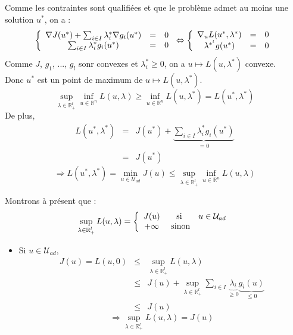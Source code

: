 \begin{dem}
Comme les contraintes sont qualifiées et que le problème admet au moins une solution $u^*$, on a :
\[\left\{ \begin{array}{c c c} 
	\nabla J(u^*) + \sum_{i\in I} \lambda_i^* \nabla g_i(u^*) &=& 0 \\
	\sum_{i\in I} \lambda_i^* g_i(u^*) &=& 0
\end{array}\right. \Leftrightarrow 
\left\{ \begin{array}{c c c}
	\nabla_u L(u^*,\lambda^*)&=&0 \\
	\lambda^{*^t} g(u^*)&=&0
\end{array} \right. \]
Comme $J$, $g_1$, ..., $g_l$ sonr convexes et $\lambda_i^*\geq 0$, on a $u\mapsto L(u,\lambda^*)$ convexe.\\
Donc $u^*$ est un point de maximum de $u\mapsto L(u,\lambda^*)$.
\[\sup_{\lambda\in \mathbb{R}^l_+} \inf_{u\in \mathbb{R}^n} L(u,\lambda) \geq \inf_{u\in \mathbb{R}^n} L(u,\lambda^*)=L(u^*,\lambda^*)\]
De plus,
\begin{eqnarray*}
	L(u^*,\lambda^*)&=&J(u^*)+\underbrace{\sum_{i\in I} \lambda_i^* g_i(u^*)}_{=0} \\
			&=&J(u^*)
\end{eqnarray*}
\[\Rightarrow L(u^*,\lambda^*)=\min_{u\in\mathcal{U}_{ad}} J(u)\leq \sup_{\lambda\in\mathbb{R}^l_+} \inf_{u\in\mathbb{R}^n} L(u,\lambda)\]

\bigskip
Montrons à présent que :
\[\sup_{\lambda\in\mathbb{R}^l_+} L(u,\lambda)=\left\{ \begin{array}{c c c}
	J(u) &\text{ si }& u\in\mathcal{U}_{ad}\\
	+\infty &\text{ sinon}&
\end{array} \right.\]

\begin{itemize}
	\item Si $u\in \mathcal{U}_{ad}$,
	\begin{eqnarray*}
		J(u)=L(u,0)&\leq& \sup_{\lambda\in \mathbb{R}^l_+} L(u,\lambda)\\
				&\leq& J(u)+\sup_{\lambda\in\mathbb{R}^l_+} \sum_{i\in I} \underbrace{\lambda_i}_{\geq 0} \underbrace{g_i(u)}_{\leq 0}\\
				&\leq& J(u)
	\end{eqnarray*}
	\[\Rightarrow \sup_{\lambda\in\mathbb{R}^l_+} L(u,\lambda) = J(u)\]


\end{itemize}
\end{dem}
